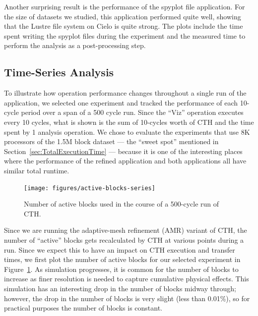 Another surprising result is the performance of the spyplot file application.
For the size of datasets we studied, this application performed quite well, showing that
the Lustre file system on Cielo is quite strong.  The plots include the time
spent writing the spyplot files during the experiment and the measured time to
perform the analysis as a post-processing step.



\FloatBarrier

\subsection{Time-Series Analysis}

To illustrate how operation performance changes throughout a single run
of the application, we selected one experiment and tracked the performance of
each 10-cycle period over a span of a 500 cycle run.  Since the ``Viz''
operation executes every 10 cycles, what is shown is the sum of 10-cycles worth
of CTH and the time spent by 1 analysis operation. We chose to evaluate
the experiments that use 8K processors of the 1.5M block dataset --- the ``sweet
spot'' mentioned in Section~\ref{sec:TotalExecutionTime} --- because it is one of
the interesting places where the performance of the refined \insitu application
and both \intransit applications all have similar total runtime.

\begin{figure}[tbp]
\begin{centering}
\texttt{[image: figures/active-blocks-series]}
\caption[Active Blocks]{Number of active blocks used in the course of a
500-cycle run of CTH.}
\label{fig:active-blocks}
\end{centering}
\end{figure}

Since we are running the adaptive-mesh refinement (AMR)
variant of CTH, the number of ``active'' blocks gets
recalculated by CTH at various points during a run. Since we expect this
to have an impact on CTH execution and \intransit transfer times, we first plot
the number of active blocks for our selected experiment in
Figure~\ref{fig:active-blocks}.  As simulation progresses, it is common for
the number of blocks to increase as finer resolution is needed to capture
cumulative physical effects.  This simulation has an interesting drop in
the number of blocks midway through; however, the drop in the number of
blocks is very slight (less than 0.01\%), so for practical purposes the
number of blocks is constant.


